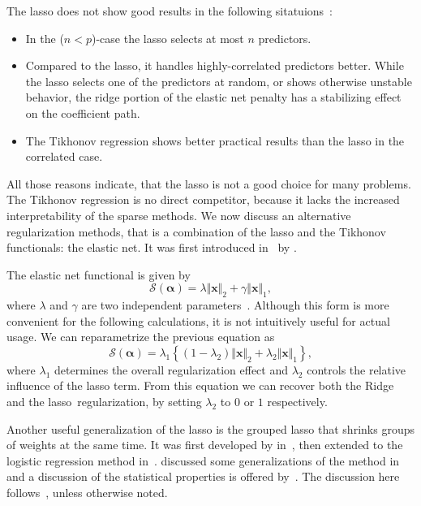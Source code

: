 The lasso does not show good results in the following sitatuions~\cite{elasticnet}:
\begin{itemize}
\item In the (\(n < p\))-case the lasso selects at most \(n\) predictors.
\item Compared to the lasso, it handles highly-correlated predictors better.
While the lasso selects one of the predictors at random, or shows otherwise
unstable behavior, the ridge portion of the elastic net penalty has a
stabilizing effect on the coefficient path.
\item The Tikhonov regression shows better practical results than the lasso in the
  correlated case.
\end{itemize}
All those reasons indicate, that the lasso is not a good choice for many problems.
The Tikhonov regression is no direct competitor, because it lacks the increased interpretability of the sparse methods.
We now discuss an alternative regularization methods, that is a combination of
the lasso and the Tikhonov functionals: the elastic net.
It was first introduced in~\cite{elasticnet} by \citeauthor{elasticnet}.

The elastic net functional is given by
\begin{equation}
  \label{eq:elastic-net}
  \mathcal{S}(\bm{\alpha}) = \lambda \Vert \bm{x} \Vert_2 +  \gamma \Vert \bm{x} \Vert _1,
\end{equation}
where \(\lambda\) and \(\gamma\) are two independent parameters~\cite{elastic-net}.
Although this form is more convenient for the following calculations, it is not intuitively useful for actual usage.
We can reparametrize the previous equation as
\begin{equation*}
  \mathcal{S}(\bm{\alpha}) = \lambda_1 \left\{ \left(1 - \lambda_2 \right) \Vert \bm{x} \Vert_2  + \lambda_2 \Vert \bm{x} \Vert _1\right\},
\end{equation*}
where \(\lambda_1\) determines the overall regularization effect and \(\lambda_2\) controls the relative influence of the lasso term.
From this equation we can recover both the Ridge and the lasso\ regularization, by setting \(\lambda_2\) to \(0\) or \(1\) respectively.

Another useful generalization of the lasso is the grouped lasso that shrinks
groups of weights at the same time.
It was first developed by \citeauthor{grouplasso} in~\cite{grouplasso}, then
extended to the logistic regression method in~\cite{grouplasso-logistic}.
\citeauthor{grouplasso-generalizations} discussed some generalizations of the
method in~\cite{grouplasso-generalizations} and a discussion of the statistical
properties is offered by~\cite{grouplasso-benefit}.
The discussion here follows~\cite{sparse-learning}, unless otherwise noted.

